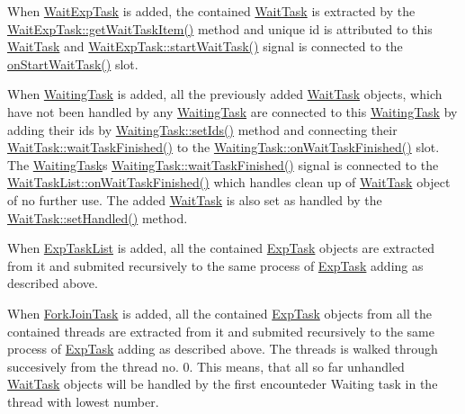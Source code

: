 When \hyperlink{class_wait_exp_task}{Wait\+Exp\+Task} is added, the contained \hyperlink{class_wait_task}{Wait\+Task} is extracted by the \hyperlink{class_wait_exp_task_ae9c89cd3011fe082c884fef466317291}{Wait\+Exp\+Task\+::get\+Wait\+Task\+Item()} method and unique id is attributed to this \hyperlink{class_wait_task}{Wait\+Task} and \hyperlink{class_wait_exp_task_a0e6b8df7760857ace81f82deb888fb23}{Wait\+Exp\+Task\+::start\+Wait\+Task()} signal is connected to the \hyperlink{class_wait_task_list_a802528b32bbcacb201bdd5fcfc4dacf6}{on\+Start\+Wait\+Task()} slot.

When \hyperlink{class_waiting_task}{Waiting\+Task} is added, all the previously added \hyperlink{class_wait_task}{Wait\+Task} objects, which have not been handled by any \hyperlink{class_waiting_task}{Waiting\+Task} are connected to this \hyperlink{class_waiting_task}{Waiting\+Task} by adding their ids by \hyperlink{class_waiting_task_a5123ece4b96ec9229d01d28db64094fa}{Waiting\+Task\+::set\+Ids()} method and connecting their \hyperlink{class_wait_task_ae52cf854c36339a1cad9c643e6259978}{Wait\+Task\+::wait\+Task\+Finished()} to the \hyperlink{class_waiting_task_a93e5b1b87723904e6a4babef1bbd4727}{Waiting\+Task\+::on\+Wait\+Task\+Finished()} slot. The \hyperlink{class_waiting_task}{Waiting\+Task}\textquotesingle{}s \hyperlink{class_waiting_task_a603610acef7edaa2e0e51af6776a18ca}{Waiting\+Task\+::wait\+Task\+Finished()} signal is connected to the \hyperlink{class_wait_task_list_ab6c3634d0739c8948b028c8db86d804c}{Wait\+Task\+List\+::on\+Wait\+Task\+Finished()} which handles clean up of \hyperlink{class_wait_task}{Wait\+Task} object of no further use. The added \hyperlink{class_wait_task}{Wait\+Task} is also set as handled by the \hyperlink{class_wait_task_ae128632bbf239153c64a5ba968643747}{Wait\+Task\+::set\+Handled()} method.

When \hyperlink{class_exp_task_list}{Exp\+Task\+List} is added, all the contained \hyperlink{class_exp_task}{Exp\+Task} objects are extracted from it and submited recursively to the same process of \hyperlink{class_exp_task}{Exp\+Task} adding as described above.

When \hyperlink{class_fork_join_task}{Fork\+Join\+Task} is added, all the contained \hyperlink{class_exp_task}{Exp\+Task} objects from all the contained threads are extracted from it and submited recursively to the same process of \hyperlink{class_exp_task}{Exp\+Task} adding as described above. The threads is walked through succesively from the thread no. 0. This means, that all so far unhandled \hyperlink{class_wait_task}{Wait\+Task} objects will be handled by the first encounteder Waiting task in the thread with lowest number.

